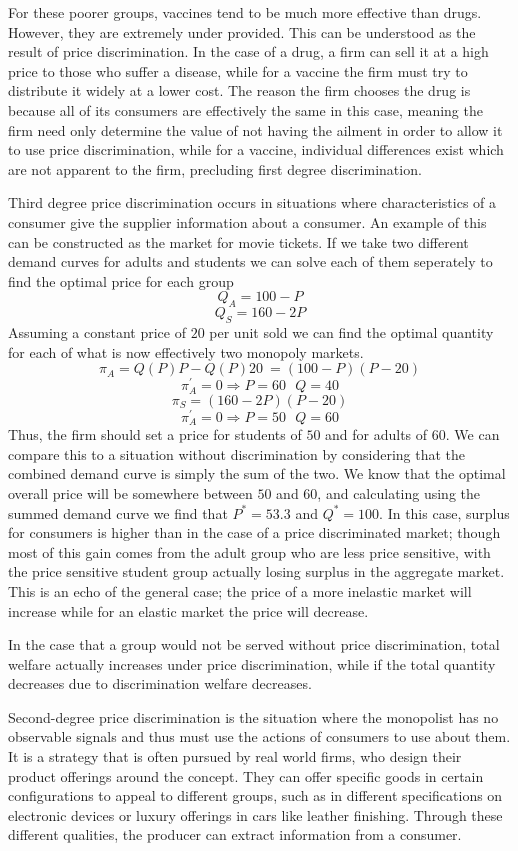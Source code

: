 \documentclass[12pt]{report}
\begin{document}
\begin{flushleft}
\bigskip
For these poorer groups, vaccines tend to be much more effective than drugs.
However, they are extremely under provided. This can be understood as the
result of price discrimination. In the case of a drug, a firm can sell it at
a high price to those who suffer a disease, while for a vaccine the firm must
try to distribute it widely at a lower cost. The reason the firm chooses the
drug is because all of its consumers are effectively the same in this case,
meaning the firm need only determine the value of not having the ailment in
order to allow it to use price discrimination, while for a vaccine, individual
differences exist which are not apparent to the firm, precluding first degree
discrimination.

\bigskip
Third degree price discrimination occurs in situations where characteristics of
a consumer give the supplier information about a consumer. An example of this 
can be constructed as the market for movie tickets. If we take two different
demand curves for adults and students we can solve each of them seperately to
find the optimal price for each group
\[Q_A = 100 - P\]
\[Q_S = 160 - 2P\]
Assuming a constant price of \(20\) per unit sold we can find the optimal 
quantity for each of what is now effectively two monopoly markets.
\[\pi_A = Q(P)P - Q(P)20\ = (100 - P)(P - 20)\]
\[\pi_A^\prime = 0 \Rightarrow P = 60 \:\:\: Q = 40\]
\[\pi_S = (160 - 2P)(P - 20)\]
\[\pi_A^\prime = 0 \Rightarrow P = 50 \:\:\: Q = 60\]
Thus, the firm should set a price for students of \(50\) and for adults of 
\(60\). We can compare this to a situation without discrimination by 
considering that the combined demand curve is simply the sum of the two.
We know that the optimal overall price will be somewhere between \(50\) and
\(60\), and calculating using the summed demand curve we find that 
\(P^* = 53.3\) and \(Q^* = 100\). In this case, surplus for consumers is 
higher than in the case of a price discriminated market; though most of this
gain comes from the adult group who are less price sensitive, with the price
sensitive student group actually losing surplus in the aggregate market. This
is an echo of the general case; the price of a more inelastic market will 
increase while for an elastic market the price will decrease.

\bigskip
In the case that a group would not be served without price discrimination,
total welfare actually increases under price discrimination, while if the
total quantity decreases due to discrimination welfare decreases.

\bigskip
Second-degree price discrimination is the situation where the monopolist has
no observable signals and thus must use the actions of consumers to use about
them. It is a strategy that is often pursued by real world firms, who design 
their product offerings around the concept. They can offer specific goods in
certain configurations to appeal to different groups, such as in different 
specifications on electronic devices or luxury offerings in cars like leather
finishing. Through these different qualities, the producer can extract 
information from a consumer.


\end{flushleft}
\end{document}
